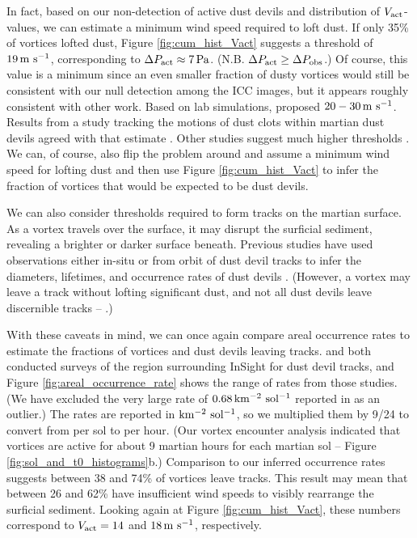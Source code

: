 \documentclass{aastex63}
\begin{document}
In fact, based on our non-detection of active dust devils and distribution of $V_{\rm act}$-values, we can estimate a minimum wind speed required to loft dust. If only 35\% of vortices lofted dust, Figure \ref{fig:cum_hist_Vact} suggests a threshold of $19\,{\rm m\ s^{-1}}$, corresponding to $\Delta P_{\rm act} \approx 7\,{\rm Pa}$. (N.B. $\Delta P_{\rm act} \geq \Delta P_{\rm obs}$.) Of course, this value is a minimum since an even smaller fraction of dusty vortices would still be consistent with our null detection among the ICC images, but it appears roughly consistent with other work. Based on lab simulations, \citet{2003JGRE..108.5041G} proposed $20-30\,{\rm m\ s^{-1}}$. Results from a study tracking the motions of dust clots within martian dust devils agreed with that estimate \citep{2011GeoRL..3824206C}. Other studies suggest much higher thresholds \citep[\emph{cf.}][]{2006JGRE..11112002C}. We can, of course, also flip the problem around and assume a minimum wind speed for lofting dust and then use Figure \ref{fig:cum_hist_Vact} to infer the fraction of vortices that would be expected to be dust devils.

We can also consider thresholds required to form tracks on the martian surface. As a vortex travels over the surface, it may disrupt the surficial sediment, revealing a brighter or darker surface beneath. Previous studies have used observations either in-situ or from orbit of dust devil tracks to infer the diameters, lifetimes, and occurrence rates of dust devils \citep[\emph{e.g.},][]{2008JGRE..113.7002W}. (However, a vortex may leave a track without lofting significant dust, and not all dust devils leave discernible tracks -- \citealp{2005JGRE..110.6002G}.) 

With these caveats in mind, we can once again compare areal occurrence rates to estimate the fractions of vortices and dust devils leaving tracks. \citet{2016Icar..266..315R} and \citet{2020GeoRL..4787234P} both conducted surveys of the region surrounding InSight for dust devil tracks, and Figure \ref{fig:areal_occurrence_rate} shows the range of rates from those studies. (We have excluded the very large rate of $0.68\,{\rm km^{-2}\ sol^{-1}}$ reported in \citet{2020GeoRL..4787234P} as an outlier.) The rates are reported in ${\rm km^{-2}\ sol^{-1}}$, so we multiplied them by 9/24 to convert from per sol to per hour. (Our vortex encounter analysis indicated that vortices are active for about 9 martian hours for each martian sol -- Figure \ref{fig:sol_and_t0_histograms}b.) Comparison to our inferred occurrence rates suggests between 38 and 74\% of vortices leave tracks. This result may mean that between 26 and 62\% have insufficient wind speeds to visibly rearrange the surficial sediment. Looking again at Figure \ref{fig:cum_hist_Vact}, these numbers correspond to $V_{\rm act} = 14$ and $18\,{\rm m\ s^{-1}}$, respectively. 
\end{document}
